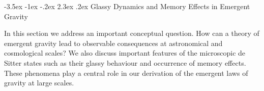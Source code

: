 \documentclass[a4paper,12pt]{article}
\makeatletter
\renewcommand\section{\@startsection {section}{1}{\z@}%
                                   {-3.5ex \@plus -1ex \@minus -.2ex}%
                                   {2.3ex \@plus.2ex}%
                                   {\normalfont\large\bfseries}}
\makeatother
\begin{document}





\section{Glassy Dynamics and Memory Effects in Emergent Gravity }

In this section we address an important conceptual question.  How can a theory of emergent gravity lead to observable consequences at astronomical and cosmological scales? We also discuss important features of the microscopic de Sitter states such as their glassy behaviour and occurrence of memory effects. These phenomena play a central role in our derivation of the emergent laws of gravity at large scales. 
\end{document}
